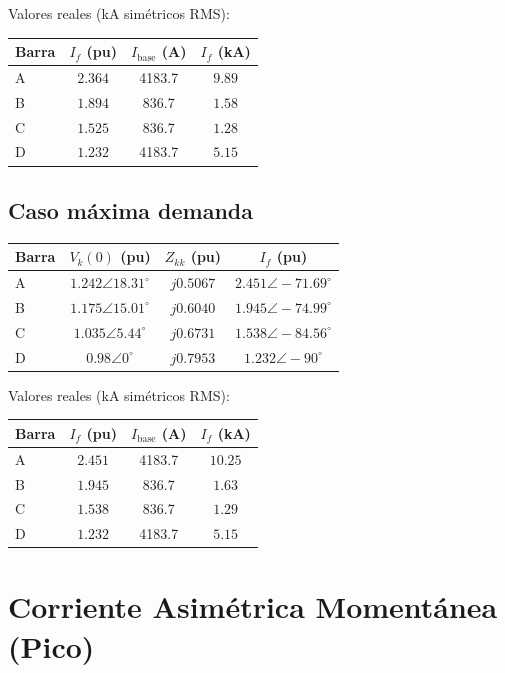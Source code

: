 \documentclass[12pt,a4paper]{article}
\begin{document}
Valores reales (kA simétricos RMS):

\begin{center}
\begin{tabular}{lccc}
\toprule
Barra & $I_f$ (pu) & $I_{\text{base}}$ (A) & $I_f$ (kA) \\
\midrule
A & $2.364$ & 4183.7 & $9.89$ \\
B & $1.894$ & 836.7 & $1.58$ \\
C & $1.525$ & 836.7 & $1.28$ \\
D & $1.232$ & 4183.7 & $5.15$ \\
\bottomrule
\end{tabular}
\end{center}

\subsection{Caso máxima demanda}

\begin{center}
\begin{tabular}{lccc}
\toprule
Barra & $V_k(0)$ (pu) & $Z_{kk}$ (pu) & $I_f$ (pu) \\
\midrule
A & $1.242\angle18.31^\circ$ & $j0.5067$ & $2.451\angle-71.69^\circ$ \\
B & $1.175\angle15.01^\circ$ & $j0.6040$ & $1.945\angle-74.99^\circ$ \\
C & $1.035\angle5.44^\circ$ & $j0.6731$ & $1.538\angle-84.56^\circ$ \\
D & $0.98\angle0^\circ$ & $j0.7953$ & $1.232\angle-90^\circ$ \\
\bottomrule
\end{tabular}
\end{center}

Valores reales (kA simétricos RMS):

\begin{center}
\begin{tabular}{lccc}
\toprule
Barra & $I_f$ (pu) & $I_{\text{base}}$ (A) & $I_f$ (kA) \\
\midrule
A & $2.451$ & 4183.7 & $10.25$ \\
B & $1.945$ & 836.7 & $1.63$ \\
C & $1.538$ & 836.7 & $1.29$ \\
D & $1.232$ & 4183.7 & $5.15$ \\
\bottomrule
\end{tabular}
\end{center}

\section{Corriente Asimétrica Momentánea (Pico)}
\end{document}
